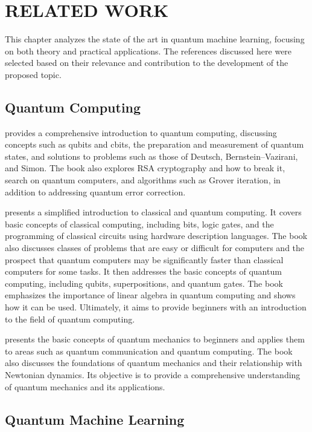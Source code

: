 \chapter{RELATED WORK}\label{chap_trabalhos_relacionados}

This chapter analyzes the state of the art in quantum machine learning, focusing on both theory and practical applications. The references discussed here were selected based on their relevance and contribution to the development of the proposed topic.

\section{Quantum Computing}

 provides a comprehensive introduction to quantum computing, discussing concepts such as qubits and cbits, the preparation and measurement of quantum states, and solutions to problems such as those of Deutsch, Bernstein--Vazirani, and Simon. The book also explores RSA cryptography and how to break it, search on quantum computers, and algorithms such as Grover iteration, in addition to addressing quantum error correction.

 presents a simplified introduction to classical and quantum computing. It covers basic concepts of classical computing, including bits, logic gates, and the programming of classical circuits using hardware description languages. The book also discusses classes of problems that are easy or difficult for computers and the prospect that quantum computers may be significantly faster than classical computers for some tasks. It then addresses the basic concepts of quantum computing, including qubits, superpositions, and quantum gates. The book emphasizes the importance of linear algebra in quantum computing and shows how it can be used. Ultimately, it aims to provide beginners with an introduction to the field of quantum computing.

 presents the basic concepts of quantum mechanics to beginners and applies them to areas such as quantum communication and quantum computing. The book also discusses the foundations of quantum mechanics and their relationship with Newtonian dynamics. Its objective is to provide a comprehensive understanding of quantum mechanics and its applications.

\section{Quantum Machine Learning}

